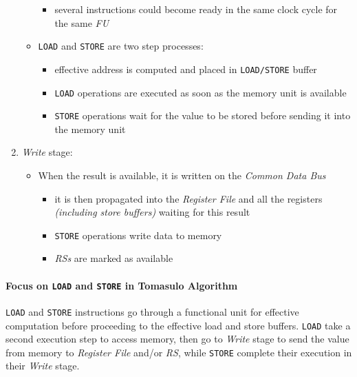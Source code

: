 \documentclass[english]{article}
\begin{document}
\begin{enumerate}
\begin{itemize}
\begin{itemize}
                  \item several instructions could become ready in the same clock cycle for the same \textit{FU}
                \end{itemize}
          \item \texttt{LOAD} and \texttt{STORE} are two step processes:
                \begin{itemize}
                  \item effective address is computed and placed in \texttt{LOAD/STORE} buffer
                  \item \texttt{LOAD} operations are executed as soon as the memory unit is available
                  \item \texttt{STORE} operations wait for the value to be stored before sending it into the memory unit
                \end{itemize}
        \end{itemize}
  \item \textit{Write} stage:
        \begin{itemize}
          \item When the result is available, it is written on the \textit{Common Data Bus}
                \begin{itemize}
                  \item it is then propagated into the \textit{Register File} and all the registers \textit{(including store buffers)} waiting for this result
                  \item \texttt{STORE} operations write data to memory
                  \item \textit{RSs} are marked as available
                \end{itemize}
        \end{itemize}
\end{enumerate}

\paragraph{Focus on \texttt{LOAD} and \texttt{STORE} in Tomasulo Algorithm}

\texttt{LOAD} and \texttt{STORE} instructions go through a functional unit for effective computation before proceeding to the effective load and store buffers.
\texttt{LOAD} take a second execution step to access memory, then go to \textit{Write} stage to send the value from memory to \textit{Register File} and/or \textit{RS}, while \texttt{STORE} complete their execution in their \textit{Write} stage.
\end{document}
